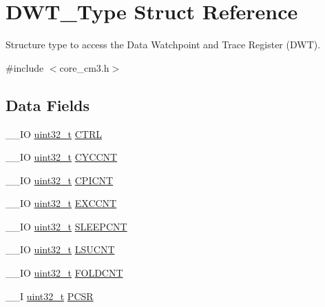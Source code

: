 \hypertarget{struct_d_w_t___type}{\section{D\-W\-T\-\_\-\-Type Struct Reference}
\label{struct_d_w_t___type}
}


Structure type to access the Data Watchpoint and Trace Register (D\-W\-T).  




{\ttfamily \#include $<$core\-\_\-cm3.\-h$>$}

\subsection*{Data Fields}
\begin{DoxyCompactItemize}
\item 
\-\_\-\-\_\-\-I\-O \hyperlink{stdint_8h_a435d1572bf3f880d55459d9805097f62}{uint32\-\_\-t} \hyperlink{struct_d_w_t___type_a37964d64a58551b69ce4c8097210d37d}{C\-T\-R\-L}
\item 
\-\_\-\-\_\-\-I\-O \hyperlink{stdint_8h_a435d1572bf3f880d55459d9805097f62}{uint32\-\_\-t} \hyperlink{struct_d_w_t___type_a71680298e85e96e57002f87e7ab78fd4}{C\-Y\-C\-C\-N\-T}
\item 
\-\_\-\-\_\-\-I\-O \hyperlink{stdint_8h_a435d1572bf3f880d55459d9805097f62}{uint32\-\_\-t} \hyperlink{struct_d_w_t___type_a88cca2ab8eb1b5b507817656ceed89fc}{C\-P\-I\-C\-N\-T}
\item 
\-\_\-\-\_\-\-I\-O \hyperlink{stdint_8h_a435d1572bf3f880d55459d9805097f62}{uint32\-\_\-t} \hyperlink{struct_d_w_t___type_ac0801a2328f3431e4706fed91c828f82}{E\-X\-C\-C\-N\-T}
\item 
\-\_\-\-\_\-\-I\-O \hyperlink{stdint_8h_a435d1572bf3f880d55459d9805097f62}{uint32\-\_\-t} \hyperlink{struct_d_w_t___type_a8afd5a4bf994011748bc012fa442c74d}{S\-L\-E\-E\-P\-C\-N\-T}
\item 
\-\_\-\-\_\-\-I\-O \hyperlink{stdint_8h_a435d1572bf3f880d55459d9805097f62}{uint32\-\_\-t} \hyperlink{struct_d_w_t___type_aeba92e6c7fd3de4ba06bfd94f47f5b35}{L\-S\-U\-C\-N\-T}
\item 
\-\_\-\-\_\-\-I\-O \hyperlink{stdint_8h_a435d1572bf3f880d55459d9805097f62}{uint32\-\_\-t} \hyperlink{struct_d_w_t___type_a35f2315f870a574e3e6958face6584ab}{F\-O\-L\-D\-C\-N\-T}
\item 
\-\_\-\-\_\-\-I \hyperlink{stdint_8h_a435d1572bf3f880d55459d9805097f62}{uint32\-\_\-t} \hyperlink{struct_d_w_t___type_abc5ae11d98da0ad5531a5e979a3c2ab5}{P\-C\-S\-R}

\end{DoxyCompactItemize}

